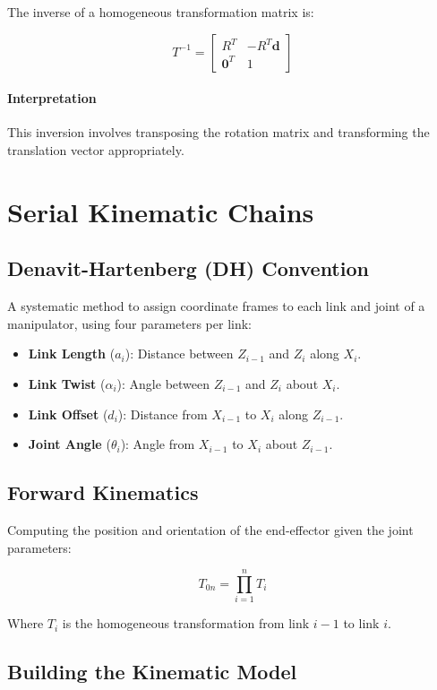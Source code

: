 \documentclass{article}
\begin{document}
The inverse of a homogeneous transformation matrix is:

$$
T^{-1} = \begin{bmatrix}
R^T & -R^T \mathbf{d} \\
\mathbf{0}^T & 1
\end{bmatrix}
$$

\paragraph{Interpretation}

This inversion involves transposing the rotation matrix and transforming the translation vector appropriately.

\section{Serial Kinematic Chains}

\subsection{Denavit-Hartenberg (DH) Convention}

A systematic method to assign coordinate frames to each link and joint of a manipulator, using four parameters per link:

\begin{itemize}
    \item \textbf{Link Length} ($a_i$): Distance between $Z_{i-1}$ and $Z_i$ along $X_i$.
    \item \textbf{Link Twist} ($\alpha_i$): Angle between $Z_{i-1}$ and $Z_i$ about $X_i$.
    \item \textbf{Link Offset} ($d_i$): Distance from $X_{i-1}$ to $X_i$ along $Z_{i-1}$.
    \item \textbf{Joint Angle} ($\theta_i$): Angle from $X_{i-1}$ to $X_i$ about $Z_{i-1}$.
\end{itemize}

\subsection{Forward Kinematics}

Computing the position and orientation of the end-effector given the joint parameters:

$$
T_{0n} = \prod_{i=1}^n T_i
$$

Where $T_i$ is the homogeneous transformation from link $i-1$ to link $i$.

\subsection{Building the Kinematic Model}
\end{document}
